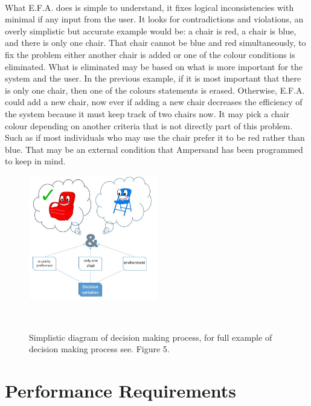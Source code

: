 \documentclass[12pt]{report}
\begin{document}
\paragraph*{}
What E.F.A. does is simple to understand, it fixes logical inconsistencies with minimal if any 
input from the user. It looks for contradictions and violations, an overly simplistic but accurate 
example would be: a chair is red, a chair is blue, and there is only one chair. That chair cannot 
be blue and red simultaneously, to fix the problem either another chair is added or one of the 
colour conditions is eliminated. What is eliminated may be based on what is more important for the 
system and the user. In the previous example, if it is most important that there is only one chair, 
then one of the colours statements is erased. Otherwise, E.F.A. could add a new chair, now ever if 
adding a new chair decreases the efficiency of the system because it must keep track of two chairs 
now. It may pick a chair colour depending on another criteria that is not directly part of this 
problem. Such as if most individuals who may use the chair prefer it to be red rather than blue. 
That may be an external condition that Ampersand has been programmed to keep in mind. 
\begin{figure}
	\centering
	\includegraphics[width=0.5\textwidth]{../figures/blueorredchair}
	\caption{Simplistic diagram of decision making process, for full example of decision making 
	process see. Figure 5.}~\label{fig:figure4}
\end{figure}

\section{Performance Requirements}\label{sec:Performance}
\end{document}
